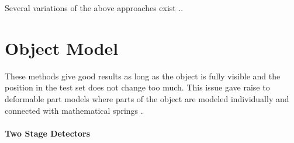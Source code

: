 	Several variations of the above approaches exist ..
	
	\section{Object Model}
	
	 These methods give good results as long as the object is fully visible and the position in the test set does not change too much. This issue gave raise to deformable part models where parts of the object are modeled individually and connected with mathematical springs \cite{Viola2004}.

	\paragraph{Two Stage Detectors}
			
